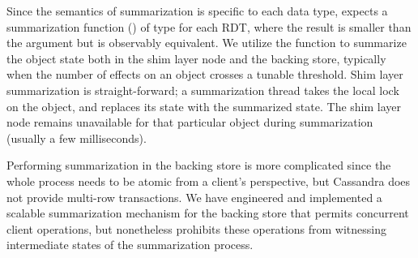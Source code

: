 Since the semantics of summarization is specific to each data type, \name
expects a summarization function () of type \cf{[e]->[e]} for
each RDT, where the result is smaller than the argument but is observably
equivalent. We utilize the  function to summarize the object
state both in the shim layer node and the backing store, typically when the
number of effects on an object crosses a tunable threshold. Shim layer
summarization is straight-forward; a summarization thread takes the local lock
on the object, and replaces its state with the summarized state. The shim layer
node remains unavailable for that particular object during summarization
(usually a few milliseconds).

Performing summarization in the backing store is more complicated since the
whole process needs to be atomic from a client's perspective, but Cassandra
does not provide multi-row transactions. We have engineered and implemented
a scalable summarization mechanism for the backing store that permits
concurrent client operations, but nonetheless prohibits these operations
from witnessing intermediate states of the summarization process.
